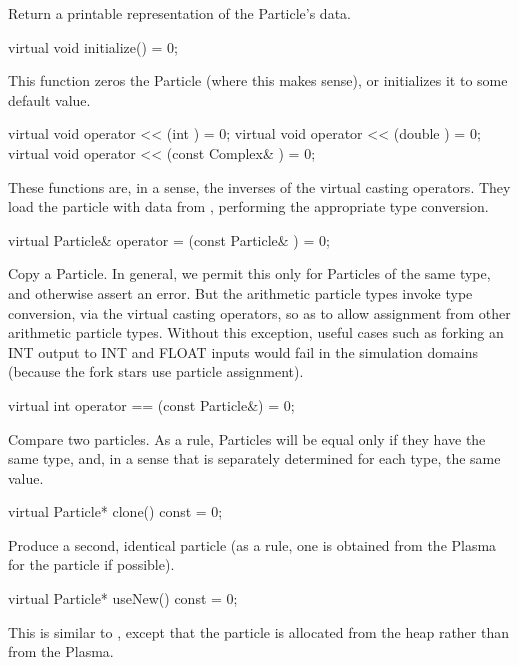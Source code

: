 Return a printable representation of the Particle's data.

\begin{example}
virtual void initialize() = 0;
\end{example}

This function zeros the Particle (where this makes sense), or
initializes it to some default value.

\begin{example}
virtual void operator << (int ) = 0;
virtual void operator << (double ) = 0;
virtual void operator << (const Complex& ) = 0;
\end{example}

These functions are, in a sense, the inverses of the virtual casting
operators.  They load the particle with data from , performing
the appropriate type conversion.

\begin{example}
virtual Particle& operator = (const Particle& ) = 0;
\end{example}

Copy a Particle.  In general, we permit this only for Particles of the
same type, and otherwise assert an error.  But the arithmetic particle
types invoke type conversion, via the virtual casting operators, so as to
allow assignment from other arithmetic particle types.  Without this
exception, useful cases such as forking an INT output to INT and FLOAT
inputs would fail in the simulation domains (because the fork stars use
particle assignment).

\begin{example}
virtual int operator == (const Particle&) = 0;
\end{example}

Compare two particles.  As a rule, Particles will be equal only if
they have the same type, and, in a sense that is separately determined
for each type, the same value.

\begin{example}
virtual Particle* clone() const = 0;
\end{example}

Produce a second, identical particle (as a rule, one is obtained from
the Plasma for the particle if possible).

\begin{example}
virtual Particle* useNew() const = 0;
\end{example}

This is similar to , except that the particle is allocated
from the heap rather than from the Plasma.

